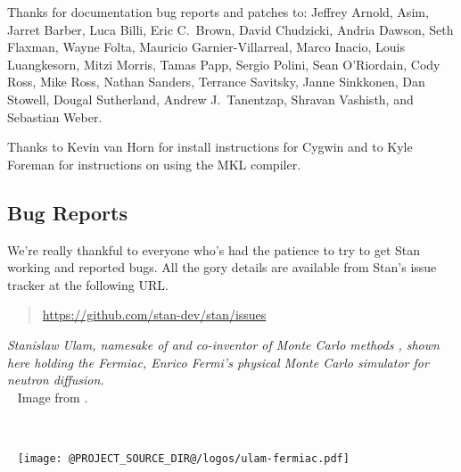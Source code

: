 Thanks for documentation bug reports and patches to: 
Jeffrey Arnold,
Asim, 
Jarret Barber, 
Luca Billi, 
Eric C.~Brown, 
David Chudzicki,
Andria Dawson, 
Seth Flaxman, 
Wayne Folta, 
Mauricio Garnier-Villarreal,
Marco Inacio, 
Louis Luangkesorn, 
Mitzi Morris,
Tamas Papp, 
Sergio Polini,
Sean O'Riordain, 
Cody Ross, 
Mike Ross, 
Nathan Sanders, 
Terrance Savitsky,
Janne Sinkkonen, 
Dan Stowell, 
Dougal Sutherland, 
Andrew J.~Tanentzap,
Shravan Vashisth, 
and Sebastian Weber.

Thanks to Kevin van Horn for install instructions for Cygwin and to
Kyle Foreman for instructions on using the MKL compiler.


\subsection*{Bug Reports}

We're really thankful to everyone who's had the patience to try
to get Stan working and reported bugs.  All the gory details are
available from Stan's issue tracker at the following URL.
%
\begin{quote}
\url{https://github.com/stan-dev/stan/issues}
\end{quote}




\vfill
\begin{center}
\hfill
\begin{minipage}[b]{2in}
  \footnotesize {\it Stanislaw Ulam, namesake of \Stan and co-inventor
    of Monte Carlo methods \citep{MetropolisUlam:1949}, shown here
    holding the Fermiac, Enrico Fermi's physical Monte Carlo simulator
    for neutron diffusion.}
  \\[3pt] \mbox{ } \hfill
  {\scriptsize Image from \citep{Giesler:2000}.}
\end{minipage} \ \ \ \ \ 
\begin{minipage}[b]{1.5in} \mbox{ } \hfill
  \texttt{[image: @PROJECT\_SOURCE\_DIR@/logos/ulam-fermiac.pdf]}
\end{minipage} 
\end{center}
